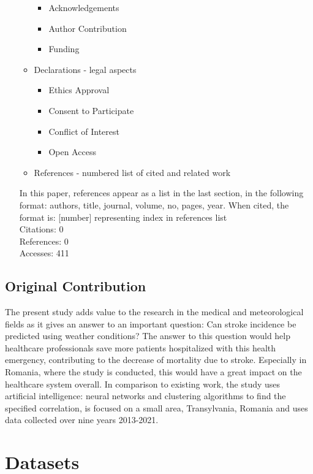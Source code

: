 \documentclass{article}
\begin{document}
\begin{itemize}
\begin{itemize}
\begin{itemize}
    \item Acknowledgements
    \item Author Contribution
    \item Funding
\end{itemize}
\item Declarations - legal aspects
\begin{itemize}
    \item Ethics Approval
    \item Consent to Participate
    \item Conflict of Interest
    \item Open Access
\end{itemize}
\item References - numbered list of cited and related work
\end{itemize}
In this paper, references appear as a list in the last section, in the following format: authors, title, journal, volume, no, pages, year. When cited, the format is: [number] representing index in references list\\

Citations: 0\\
References: 0\\
Accesses: 411
\end{itemize}

\subsection{Original Contribution}

The present study adds value to the research in the medical and meteorological fields as it gives an answer to an important question: Can stroke incidence be predicted using weather conditions? The answer to this question would help healthcare professionals save more patients hospitalized with this health emergency, contributing to the decrease of mortality due to stroke. Especially in Romania, where the study is conducted, this would have a great impact on the healthcare system overall. In comparison to existing work, the study uses artificial intelligence: neural networks and clustering algorithms to find the specified correlation, is focused on a small area, Transylvania, Romania and uses data collected over nine years 2013-2021. 

\newpage
\section{Datasets} \label{datasets}
\end{document}
